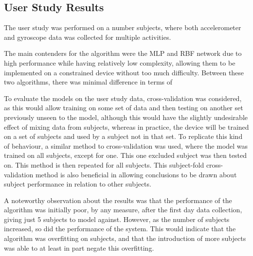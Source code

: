 \subsection{User Study Results}
The user study was performed on a number  subjects, where both accelerometer and gyroscope data was collected for multiple activities.

The main contenders for the algorithm were the MLP and RBF network due to high performance while having relatively low complexity, allowing them to be implemented on a constrained device without too much difficulty. Between these two algorithms, there was minimal difference in terms of 

To evaluate the models on the user study data, cross-validation was considered, as this would allow training on some set of data and then testing on another set previously unseen to the model, although this would have the slightly undesirable effect of mixing data from subjects, whereas in practice, the device will be trained on a set of subjects and used by a subject not in that set. To replicate this kind of behaviour, a similar method to cross-validation was used, where the model was trained on all subjects, except for one. This one excluded subject was then tested on. This method is then repeated for all subjects. This subject-fold cross-validation method is also beneficial in allowing conclusions to be drawn about subject performance in relation to other subjects.

A noteworthy observation about the results was that the performance of the algorithm was initially poor, by any measure, after the first day data collection, giving just 5  subjects to model against. However, as the number of subjects increased, so did the performance of the system. This would indicate that the algorithm was overfitting on subjects, and that the introduction of more subjects was able to at least in part negate this overfitting.


